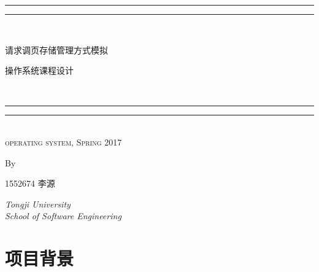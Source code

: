\documentclass{article}
\begin{document}
 
\begin{CJK}{UTF8}{gbsn}

\newcommand*{\titleGP}{\begingroup %
\centering %
\vspace*{\baselineskip} %

\rule{\textwidth}{1.6pt}\vspace*{-\baselineskip}\vspace*{2pt} %
\rule{\textwidth}{0.4pt}\\[\baselineskip] %

{\LARGE 请求调页存储管理方式模拟
 \\ \vspace{2em} \begin{large} 操作系统课程设计 \end{large}}\\[0.2\baselineskip] %

\rule{\textwidth}{0.4pt}\vspace*{-\baselineskip}\vspace{3.2pt} %
\rule{\textwidth}{1.6pt}\\[\baselineskip] %

\scshape %
operating system,  Spring 2017\par %

\vspace*{2\baselineskip} %

 By \\[\baselineskip]
{\Large1552674 李源 \par} %


\vfill %

{\itshape Tongji University \\ School of Software Engineering \par}

\endgroup}


\titleGP %
\clearpage
\tableofcontents
\clearpage

\section{项目背景}

\end{CJK}
\end{document}
